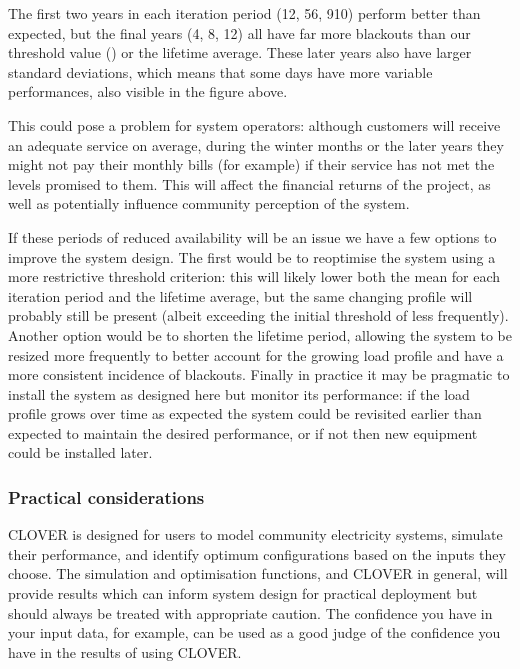 \documentclass[letterpaper,10pt,english]{sphinxmanual}
\begin{document}
\sphinxAtStartPar
The first two years in each iteration period (1\sphinxhyphen{}2, 5\sphinxhyphen{}6, 9\sphinxhyphen{}10) perform
better than expected, but the final years (4, 8, 12) all have far more
blackouts than our threshold value () or the lifetime average.
These later years also have larger standard deviations, which means that
some days have more variable performances, also visible in the figure
above.

\sphinxAtStartPar
This could pose a problem for system operators: although customers will
receive an adequate service on average, during the winter months or the
later years they might not pay their monthly bills (for example) if
their service has not met the levels promised to them. This will affect
the financial returns of the project, as well as potentially influence
community perception of the system.

\sphinxAtStartPar
If these periods of reduced availability will be an issue we have a few
options to improve the system design. The first would be to re\sphinxhyphen{}optimise
the system using a more restrictive threshold criterion: this will
likely lower both the mean for each iteration period and the lifetime
average, but the same changing profile will probably still be present
(albeit exceeding the initial threshold of  less
frequently). Another option would be to shorten the lifetime period,
allowing the system to be resized more frequently to better account for
the growing load profile and have a more consistent incidence of
blackouts. Finally in practice it may be pragmatic to install the system
as designed here but monitor its performance: if the load profile grows
over time as expected the system could be revisited earlier than
expected to maintain the desired performance, or if not then new
equipment could be installed later.


\subsubsection{Practical considerations}
\label{\detokenize{optimisation:practical-considerations}}
\sphinxAtStartPar
CLOVER is designed for users to model community electricity systems,
simulate their performance, and identify optimum configurations based on
the inputs they choose. The simulation and optimisation functions, and
CLOVER in general, will provide results which can inform system design
for practical deployment but should always be treated with appropriate
caution. The confidence you have in your input data, for example, can be
used as a good judge of the confidence you have in the results of using
CLOVER.
\end{document}
